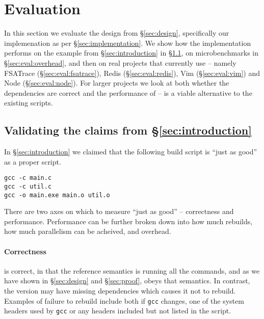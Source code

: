 \section{Evaluation}
\label{sec:evaluation}

In this section we evaluate the design from \S\ref{sec:design}, specifically our implemenation as per \S\ref{sec:implementation}. We show how the implementation performs on the example from \S\ref{sec:introduction} in \S\ref{sec:eval:introduction}, on microbenchmarks in \S\ref{sec:eval:overhead}, and then on real projects that currently use \Make -- namely FSATrace (\S\ref{sec:eval:fsatrace}), Redis (\S\ref{sec:eval:redis}), Vim (\S\ref{sec:eval:vim}) and Node (\S\ref{sec:eval:node}). For larger projects we look at both whether the dependencies are correct and the performance of \Rattle -- is \Rattle a viable alternative to the existing \Make scripts.

\subsection{Validating the claims from \S\ref{sec:introduction}}
\label{sec:eval:introduction}

In \S\ref{sec:introduction} we claimed that the following build script is ``just as good'' as a proper \Make script.

\begin{verbatim}
gcc -c main.c
gcc -c util.c
gcc -o main.exe main.o util.o
\end{verbatim}

There are two axes on which to measure ``just as good'' -- correctness and performance. Performance can be further broken down into how much rebuilds, how much parallelism can be acheived, and overhead.

\paragraph{Correctness} \Rattle is correct, in that the reference semantics is running all the commands, and as we have shown in \S\ref{sec:design} and \S\ref{sec:proof}, \Rattle obeys that semantics. In contrast, the \Make version may have missing dependencies which causes it not to rebuild. Examples of failure to rebuild include both if \texttt{gcc} changes, one of the system headers used by \texttt{gcc} or any headers included but not listed in the \Make script.

